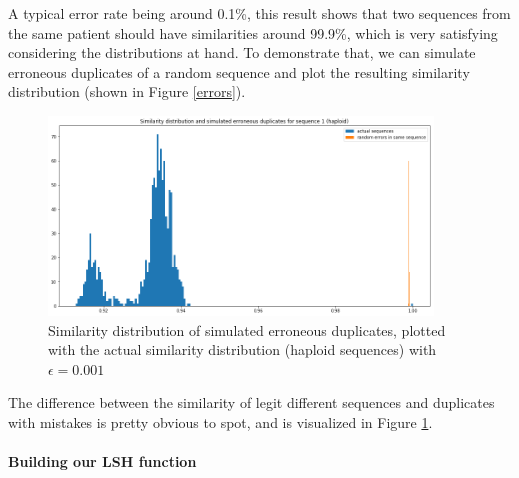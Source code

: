 \documentclass[usletter,11pt,final]{article}
\begin{document}
A typical error rate being around 0.1\%, this result shows that two sequences from the same patient should have similarities around 99.9\%, which is very satisfying considering the distributions at hand. To demonstrate that, we can simulate erroneous duplicates of a random sequence and plot the resulting similarity distribution (shown in Figure \ref{errors}).

\begin{figure}
\begin{center}
\includegraphics[height=200px]{comphist.png}
\caption{Similarity distribution of simulated erroneous duplicates, plotted with the actual similarity distribution (haploid sequences) with $\epsilon = 0.001$}
\label{comphist}
\end{center}
\end{figure}

The difference between the similarity of legit different sequences and duplicates with mistakes is pretty obvious to spot, and is visualized in Figure \ref{comphist}.

\paragraph{Building our LSH function}

\newpage
{}


\end{document}
